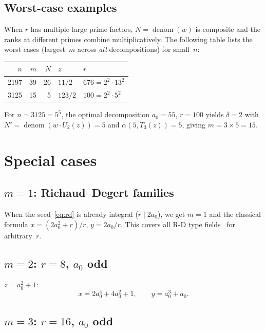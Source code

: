 \documentclass[11pt]{article}
\theoremstyle{definition}
\theoremstyle{remark}
\begin{document}
\subsection{Worst-case examples}

When $r$ has multiple large prime factors, $N = \operatorname{denom}(w)$
is composite and the ranks at different primes combine
multiplicatively.  The following table lists the worst cases
(largest~$m$ across \emph{all} decompositions) for small~$n$:

\begin{center}
\begin{tabular}{rrrll}
\toprule
$n$ & $m$ & $N$ & $z$ & $r$ \\
\midrule
2197 & 39 & 26 & $11/2$ & $676 = 2^2 \cdot 13^2$ \\
3125 & 15 & 5  & $123/2$ & $100 = 2^2 \cdot 5^2$ \\
\bottomrule
\end{tabular}
\end{center}
For $n = 3125 = 5^5$, the optimal decomposition
$a_0 = 55$, $r = 100$ yields $\delta = 2$ with
$N' = \operatorname{denom}(w \cdot U_2(z)) = 5$
and $\alpha(5, T_3(z)) = 5$, giving $m = 3 \times 5 = 15$.

\section{Special cases}

\subsection*{$m = 1$: Richaud--Degert families}

When the seed~\eqref{eq:rd} is already integral ($r \mid 2a_0$),
we get $m = 1$ and the classical formula
$x = (2a_0^2 + r)/r$, $y = 2a_0/r$.
This covers all R-D type fields~\cite{richaud1866,degert1958}
for arbitrary~$r$.

\subsection*{$m = 2$: $r = 8$, $a_0$ odd}

$z = a_0^2 + 1$:
\[
x = 2a_0^4 + 4a_0^2 + 1, \qquad y = a_0^3+a_0.
\]

\subsection*{$m = 3$: $r = 16$, $a_0$ odd}
\end{document}
